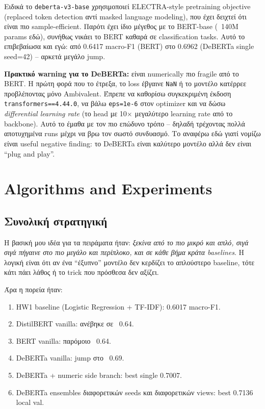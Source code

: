 \documentclass[12pt]{fphw}
\begin{document}
Ειδικά το \texttt{deberta-v3-base} χρησιμοποιεί ELECTRA-style pretraining objective (replaced token detection αντί masked language modeling), που έχει δειχτεί ότι είναι πιο sample-efficient. Παρότι έχει ίδιο μέγεθος με το BERT-base (~140M params εδώ), συνήθως νικάει το BERT καθαρά σε classification tasks. Αυτό το επιβεβαίωσα και εγώ: από 0.6417 macro-F1 (BERT) στο 0.6962 (DeBERTa single seed=42) -- αρκετά μεγάλο jump.

\textbf{Πρακτικό warning για το DeBERTa:} είναι numerically πιο fragile από το BERT. Η πρώτη φορά που το έτρεξα, το loss έβγαινε \texttt{NaN} ή το μοντέλο κατέρρεε προβλέποντας μόνο Ambivalent. Έπρεπε να καθορίσω συγκεκριμένη έκδοση \texttt{transformers==4.44.0}, να βάλω \texttt{eps=1e-6} στον optimizer και να δώσω \emph{differential learning rate} (το head με 10$\times$ μεγαλύτερο learning rate από το backbone). Αυτό το έμαθα με τον πιο επώδυνο τρόπο -- δηλαδή τρέχοντας πολλά αποτυχημένα runs μέχρι να βρω τον σωστό συνδυασμό. Το αναφέρω εδώ γιατί νομίζω είναι useful negative finding: το DeBERTa είναι καλύτερο μοντέλο αλλά δεν είναι ``plug and play''.

\section{Algorithms and Experiments}

\subsection{Συνολική στρατηγική}

Η βασική μου ιδέα για τα πειράματα ήταν: \emph{ξεκίνα από το πιο μικρό και απλό, σιγά σιγά πήγαινε στο πιο μεγάλο και περίπλοκο, και σε κάθε βήμα κράτα baselines}. Η λογική είναι ότι αν ένα ``έξυπνο'' μοντέλο δεν κερδίζει το απλούστερο baseline, τότε κάτι πάει λάθος ή το trick που πρόσθεσα δεν αξίζει.

Άρα η πορεία ήταν:
\begin{enumerate}
    \item HW1 baseline (Logistic Regression + TF-IDF): 0.6017 macro-F1.
    \item DistilBERT vanilla: ανέβηκε σε ~0.64.
    \item BERT vanilla: παρόμοιο ~0.64.
    \item DeBERTa vanilla: jump στο ~0.69.
    \item DeBERTa + numeric side branch: best single 0.7007.
    \item DeBERTa ensembles διαφορετικών seeds και διαφορετικών views: best 0.7136 local val.
\end{enumerate}
\end{document}
